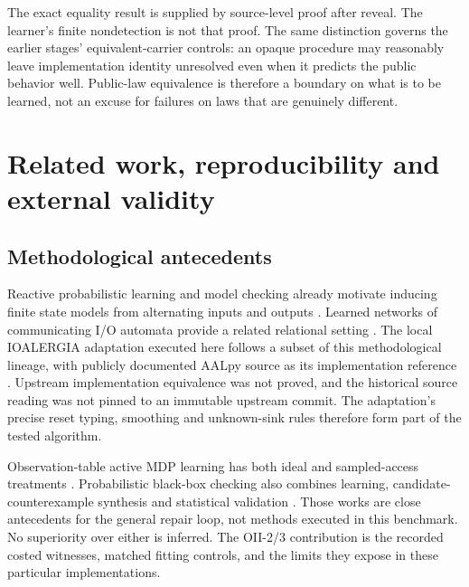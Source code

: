 The exact equality result is supplied by source-level proof after reveal. The learner's finite nondetection is not that proof. The same distinction governs the earlier stages' equivalent-carrier controls: an opaque procedure may reasonably leave implementation identity unresolved even when it predicts the public behavior well. Public-law equivalence is therefore a boundary on what is to be learned, not an excuse for failures on laws that are genuinely different.



\section{Related work, reproducibility and external validity}\label{sec:related}
\subsection{Methodological antecedents}
Reactive probabilistic learning and model checking already motivate inducing finite state models from alternating inputs and outputs \cite{Mao2012MDP}. Learned networks of communicating I/O automata provide a related relational setting \cite{MaoJaeger2012}. The local IOALERGIA adaptation executed here follows a subset of this methodological lineage, with publicly documented AALpy source as its implementation reference \cite{AALpySource}. Upstream implementation equivalence was not proved, and the historical source reading was not pinned to an immutable upstream commit. The adaptation's precise reset typing, smoothing and unknown-sink rules therefore form part of the tested algorithm.

Observation-table active MDP learning has both ideal and sampled-access treatments \cite{Tappler2019}. Probabilistic black-box checking also combines learning, candidate-counterexample synthesis and statistical validation \cite{Shijubo2023}. Those works are close antecedents for the general repair loop, not methods executed in this benchmark. No superiority over either is inferred. The OII-2/3 contribution is the recorded costed witnesses, matched fitting controls, and the limits they expose in these particular implementations.

